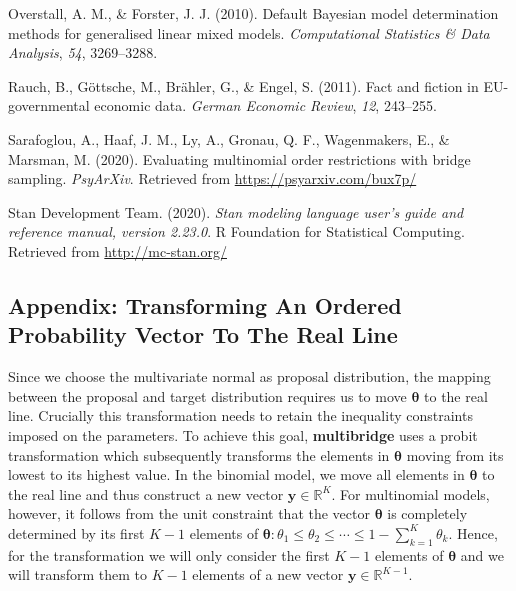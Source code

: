 \documentclass[
  english,
  man,floatsintext]{apa6}
\newlength{\cslhangindent}
\newenvironment{cslreferences}%
  {\setlength{\parindent}{0pt}%
  \everypar{\setlength{\hangindent}{\cslhangindent}}\ignorespaces}%
  {\par}
\begin{document}
\begin{cslreferences}
\leavevmode\hypertarget{ref-overstall2010default}{}%
Overstall, A. M., \& Forster, J. J. (2010). Default Bayesian model determination methods for generalised linear mixed models. \emph{Computational Statistics \& Data Analysis}, \emph{54}, 3269--3288.

\leavevmode\hypertarget{ref-rauch2011fact}{}%
Rauch, B., Göttsche, M., Brähler, G., \& Engel, S. (2011). Fact and fiction in EU-governmental economic data. \emph{German Economic Review}, \emph{12}, 243--255.

\leavevmode\hypertarget{ref-sarafoglou2020evaluatingPreprint}{}%
Sarafoglou, A., Haaf, J. M., Ly, A., Gronau, Q. F., Wagenmakers, E., \& Marsman, M. (2020). Evaluating multinomial order restrictions with bridge sampling. \emph{PsyArXiv}. Retrieved from \url{https://psyarxiv.com/bux7p/}

\leavevmode\hypertarget{ref-stan2020}{}%
Stan Development Team. (2020). \emph{Stan modeling language user's guide and reference manual, version 2.23.0}. R Foundation for Statistical Computing. Retrieved from \url{http://mc-stan.org/}
\end{cslreferences}

\endgroup

\hypertarget{appendix-transforming-an-ordered-probability-vector-to-the-real-line}{%
\subsection{Appendix: Transforming An Ordered Probability Vector To The Real Line}\label{appendix-transforming-an-ordered-probability-vector-to-the-real-line}}

Since we choose the multivariate normal as proposal distribution, the mapping between the proposal and target distribution requires us to move \(\boldsymbol{\theta}\) to the real line. Crucially this transformation needs to retain the inequality constraints imposed on the parameters. To achieve this goal, \textbf{multibridge} uses a probit transformation which subsequently transforms the elements in \(\boldsymbol{\theta}\) moving from its lowest to its highest value. In the binomial model, we move all elements in \(\boldsymbol{\theta}\) to the real line and thus construct a new vector \(\boldsymbol{y} \in \mathbb{R}^{K}\). For multinomial models, however, it follows from the unit constraint that the vector \(\boldsymbol{\theta}\) is completely determined by its first \(K - 1\) elements of \(\boldsymbol{\theta}: \theta_1 \leq \theta_2 \leq \cdots \leq 1 - \sum_{k = 1}^K \theta_k\). Hence, for the transformation we will only consider the first \(K - 1\) elements of \(\boldsymbol{\theta}\) and we will transform them to \(K - 1\) elements of a new vector \(\boldsymbol{y} \in \mathbb{R}^{K - 1}\).
\end{document}
